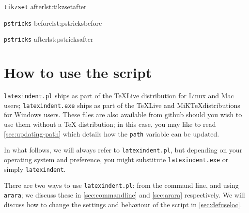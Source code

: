 \documentclass[11pt]{article}
\newenvironment{sidebyside}{\begin{adjustwidth}{-3cm}{1cm}}{\end{adjustwidth}}
\begin{document}
\begin{sidebyside}
\begin{minipage}{.6\textwidth}
\begin{cmhlistings}[style=demo]{\lstinline!tikzset! after}{lst:tikzsetafter}
		\end{cmhlistings}
	\end{minipage}
	\begin{minipage}{.6\textwidth}
		\begin{cmhlistings}[style=demo]{\lstinline!pstricks! before}{lst:pstricksbefore}
\def\Picture#1{%
\def\stripH{#1}%
\begin{pspicture}[showgrid...
\psforeach{\row}{%
{{3,2.8,2.7,3,3.1}},%
{2.8,1,1.2,2,3},%
...
}{%
\expandafter...
}
\end{pspicture}}
		\end{cmhlistings}
	\end{minipage}%
	\begin{minipage}{.6\textwidth}
		\begin{cmhlistings}[style=demo]{\lstinline!pstricks! after}{lst:pstricksafter}
\def\Picture#1{%
	\def\stripH{#1}%
	\begin{pspicture}[showgrid...
		\psforeach{\row}{%
			{{3,2.8,2.7,3,3.1}},%
			{2.8,1,1.2,2,3},%
            ...
			}{%
			\expandafter...
		}
	\end{pspicture}}
		\end{cmhlistings}
	\end{minipage}
  \end{sidebyside}

\section{How to use the script}
\lstinline!latexindent.pl! ships as part of the \TeX Live distribution for
Linux and Mac users; \lstinline!latexindent.exe! ships as part of the \TeX Live
and MiK\TeX distributions for Windows users. These files are also available
from github \cite{latexindent-home} should you wish to use them without
a \TeX{} distribution; in this case, you may like to read \vref{sec:updating-path}
which details how the \lstinline!path! variable can be updated.

In what follows, we will always refer to \lstinline!latexindent.pl!, but depending on
your operating system and preference, you might substitute \lstinline!latexindent.exe! or
simply \lstinline!latexindent!.

There are two ways to use \lstinline!latexindent.pl!: from the command line,
and using \lstinline!arara!; we discuss these in \cref{sec:commandline} and
\cref{sec:arara} respectively. We will discuss how to change the settings and 
behaviour of the script in \vref{sec:defuseloc}.
\end{document}
